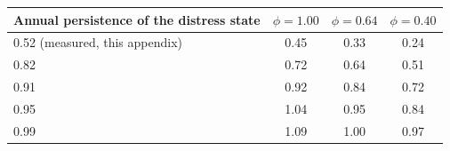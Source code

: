 \begin{tabular}{lccc}
\toprule
Annual persistence of the distress state & $\phi=1.00$ & $\phi=0.64$ & $\phi=0.40$ \\
\midrule
0.52 (measured, this appendix) & 0.45 & 0.33 & 0.24 \\
0.82 \citep{guvenen_empirical_2009} & 0.72 & 0.64 & 0.51 \\
0.91 \citep{floden_idiosyncratic_2001} & 0.92 & 0.84 & 0.72 \\
0.95 \citep{storesletten_cyclical_2004} & 1.04 & 0.95 & 0.84 \\
0.99 \citep{guvenen_empirical_2009} & 1.09 & 1.00 & 0.97 \\
\bottomrule
\end{tabular}

